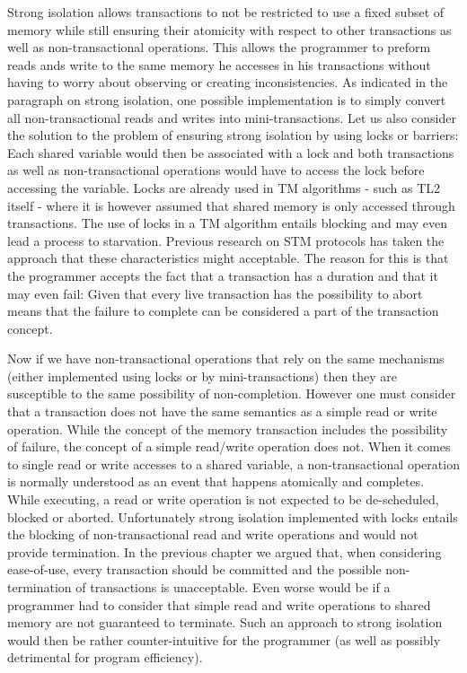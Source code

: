 Strong isolation allows transactions to not be restricted to use a fixed
subset of memory while still ensuring their atomicity with respect to
other transactions as well as non-transactional operations.
This allows the programmer to preform reads ands write to the same memory he accesses
in his transactions without having to worry about observing or creating inconsistencies.
As indicated in the paragraph on strong isolation, one possible implementation
is to simply convert all non-transactional reads and writes into mini-transactions.
Let us also consider the solution to  the problem of  ensuring strong isolation 
by using  locks or barriers: Each shared
variable would then  
be associated with a lock and both transactions as well as non-transactional 
operations would have to access the lock before accessing the variable.
Locks are already used  in TM algorithms - such as TL2  itself - where it is
however     assumed   that  shared   memory   is   only  accessed   through
transactions. The use  of locks  in a TM algorithm  entails blocking and may
even lead a process to starvation.
Previous research on STM protocols has taken the approach that
these characteristics might acceptable.
The reason for this is that the
programmer  accepts the fact that a  transaction has a duration and that it
may  even  fail: Given that every live transaction has the possibility
to abort means that the  
failure to complete can be considered a part of the transaction concept.  

Now if we have non-transactional operations that rely on the same mechanisms
(either implemented using locks or by mini-transactions) then they are susceptible
to the same possibility of non-completion.
However one must consider that a transaction does not have the same semantics
as a simple read or write operation.
While the concept of the memory  transaction includes the possibility of failure,
the concept of a simple read/write operation does not.
When it  comes to single read or  write accesses  to  a shared
variable, a  non-transactional operation is normally understood  as an
event  that  happens   atomically  and   completes.
While executing, a  read  or write  operation   is  not 
expected  to  be de-scheduled, blocked or aborted.  
Unfortunately   strong
isolation  implemented with  locks  entails the blocking  
of non-transactional read and write operations and would not provide termination.
In the previous chapter we argued that, when considering ease-of-use, 
every transaction should be committed and the
possible non-termination of transactions is unacceptable.
Even worse would be if a programmer had to consider that simple
read and write operations to shared memory are not guaranteed to terminate.
Such an approach to strong isolation would then be rather counter-intuitive for the 
programmer (as well as possibly detrimental for program efficiency).

